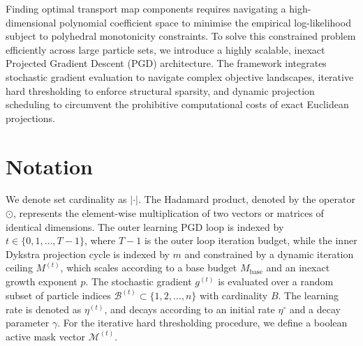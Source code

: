 Finding optimal transport map components requires navigating a high-dimensional polynomial coefficient space to minimise the empirical log-likelihood subject to polyhedral monotonicity constraints. To solve this constrained problem efficiently across large particle sets, we introduce a highly scalable, inexact Projected Gradient Descent (PGD) architecture. The framework integrates stochastic gradient evaluation to navigate complex objective landscapes, iterative hard thresholding to enforce structural sparsity, and dynamic projection scheduling to circumvent the prohibitive computational costs of exact Euclidean projections.

\section*{Notation}
We denote set cardinality as $|\cdot|$. The Hadamard product, denoted by the operator $\odot$, represents the element-wise multiplication of two vectors or matrices of identical dimensions.
The outer learning PGD loop is indexed by $t \in \{0, 1, \dots, T-1\}$, where $T-1$ is the outer loop iteration budget, while the inner Dykstra projection cycle is indexed by $m$ and constrained by a dynamic iteration ceiling $M^{(t)}$, which scales according to a base budget $M_{\mathrm{base}}$ and an inexact growth exponent $p$. The stochastic gradient $g^{(t)}$ is evaluated over a random subset of particle indices $\mathcal{B}^{(t)} \subset \{1, 2, \dots, n\}$ with cardinality $B$. The learning rate is denoted as $\eta^{(t)}$, and decays according to an initial rate $\eta^\circ$ and a decay parameter $\gamma$. For the iterative hard thresholding procedure, we define a boolean active mask vector $\mathcal{M}^{(t)}$.


